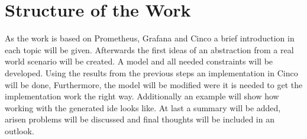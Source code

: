 \section{Structure of the Work}
As the work is based on Prometheus, Grafana and Cinco a brief introduction in each topic will be given. Afterwards the first ideas of an abstraction from a real world scenario will be created. A model and all needed constraints will be developed. Using the results from the previous steps an implementation in Cinco will be done, Furthermore, the model will be modified were it is needed to get the implementation work the right way. Additionally an example will show how working with the generated \gls{ide} looks like. At last a summary will be added, arisen problems will be discussed and final thoughts will be included in an outlook.